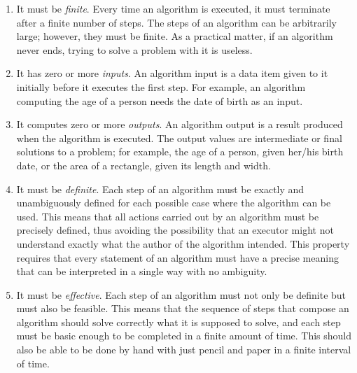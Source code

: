 \def\labelenumi{(\arabic{enumi})}
\begin{enumerate}
\item  It must be \textit{finite}. Every time an algorithm is executed, it must terminate after a finite number of steps. The steps of an algorithm can be arbitrarily large; however, they must be finite. As a practical matter, if an algorithm never ends, trying to solve a problem with it is useless.
\item  It has zero or more \textit{inputs}. An algorithm input is a data item given to it initially before it executes the first step. For example, an algorithm computing the age of a person needs the date of birth as an input.
\item  It computes zero or more \textit{outputs}. An algorithm output is a result produced when the algorithm is executed. The output values are intermediate or final solutions to a problem; for example, the age of a person, given her/his  birth date, or the area of a rectangle, given its length and width.
\item  It must be \textit{definite}. Each step of an algorithm must be exactly and unambiguously defined for each possible case where the algorithm can be used. This means that all actions carried out by an algorithm must be precisely defined, thus avoiding the possibility that an executor might not understand exactly what the author of the algorithm intended. This property requires that every statement of an algorithm must have a precise meaning that can be interpreted in a single way with no ambiguity.
\item  It must be \textit{effective}. Each step of an algorithm must not only be definite but must also be feasible. This means that the sequence of steps that compose an algorithm should solve correctly what it is supposed to solve, and each step must be basic enough to be completed in a finite amount of time. This should also be able to be done by hand with just pencil and paper in a finite interval of time.
\end{enumerate}

